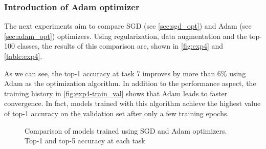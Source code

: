 \subsubsection{Introduction of Adam optimizer}
The next experiments aim to compare SGD (see \autoref{sec:sgd_opt}) and Adam (see \autoref{sec:adam_opt}) optimizers.
Using regularization, data augmentation and the top-100 classes, the results of this comparison are, shown in \autoref{fig:exp4} and \autoref{table:exp4}.

As we can see, the top-1 accuracy at task 7 improves by more than 6\% using Adam as the optimization algorithm. 
In addition to the performance aspect, the training history in \autoref{fig:exp4-train_val} shows that Adam leads to faster convergence. In fact, models trained with this algorithm achieve the highest value of top-1 accuracy on the validation set after only a few training epochs.



\begin{figure}[H]
	\centering
	\caption{Comparison of models trained using SGD and Adam optimizers. Top-1 and top-5 accuracy at each task}%
	\label{fig:exp4}%
\end{figure}

